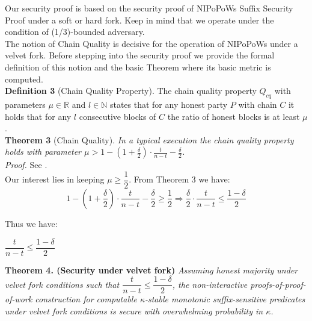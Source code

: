 Our security proof is based on the security proof of NIPoPoWs Suffix Security Proof
under a soft or hard fork. Keep in mind that we operate under the condition of
(1/3)-bounded adversary.\\

The notion of Chain Quality is decisive for the operation of NIPoPoWs under a
velvet fork. Before stepping into the security proof we provide the formal
definition of this notion and the basic Theorem where its basic metric is computed.\\

\textbf{Definition 3 }(Chain Quality Property)\cite{Backbone}. The chain quality
property $Q_{cq}$ with parameters $\mu \in \mathbb{R}$ and $l \in \mathbb{N}$
states that for any honest party $P$ with chain $C$ it holds that for any
$l $ consecutive blocks of $C$ the ratio of honest blocks is at least $\mu$.\\

\textbf{Theorem 3 }(Chain Quality)\cite{Backbone}. \textit{In a typical execution
the chain quality property holds with parameter $\mu > 1 - (1 + \frac{\delta}{2})
\cdot \frac{t}{n-t} - \frac{\delta}{2}$.}\\
\textit{Proof.} See \cite{Backbone}.\\

Our interest lies in keeping $\mu \geq \dfrac{1}{2}$.
From Theorem 3 we have:
\begin{equation*}
1 - (1 + \frac{\delta}{2}) \cdot \frac{t}{n-t} - \frac{\delta}{2} \geq \dfrac{1}{2} \Rightarrow 
\frac{\delta}{2} \cdot \frac{t}{n-t} \leq \frac{1-\delta}{2}
\end{equation*}

Thus we have:
\begin{center}
$  \dfrac{t}{n-t} \leq \dfrac{1-\delta}{2} $
\end{center}

\textbf{Theorem 4. (Security under velvet fork)} \textit{Assuming honest majority
under velvet fork conditions such that $\dfrac{t}{n-t} \leq \dfrac{1-\delta}{2}$,
the non-interactive proofs-of-proof-of-work construction for computable
$\kappa$-stable monotonic suffix-sensitive predicates under velvet fork conditions
is secure with overwhelming probability in $\kappa$.}\\

